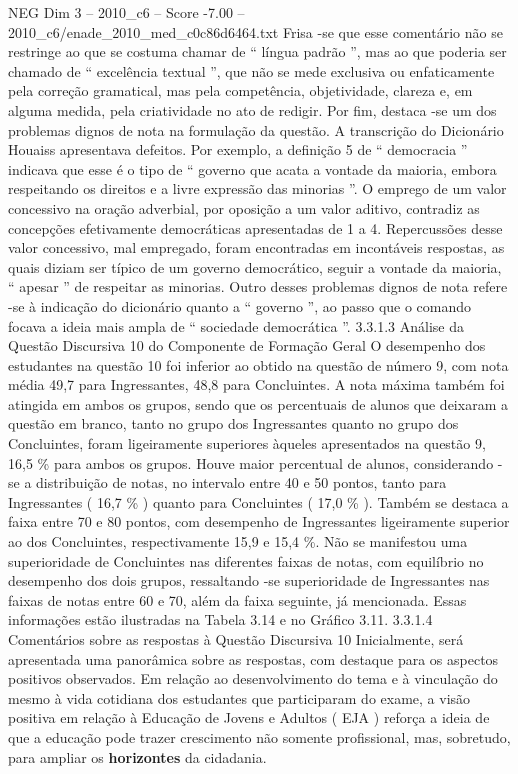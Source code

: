 \begin{textsample}{NEG Dim 3 – 2010\_c6 – Score -7.00 – 2010\_c6/enade\_2010\_med\_c0c86d6464.txt}
Frisa -se que esse comentário não se restringe ao que se costuma chamar de “ língua padrão ”, mas ao que poderia ser chamado de “ excelência textual ”, que não se mede exclusiva ou enfaticamente pela correção gramatical, mas pela competência, objetividade, clareza e, em alguma medida, pela criatividade no ato de redigir.
Por fim, destaca -se um dos problemas dignos de nota na formulação da questão.
A transcrição do Dicionário Houaiss apresentava defeitos.
Por exemplo, a definição 5 de “ democracia ” indicava que esse é o tipo de “ governo que acata a vontade da maioria, embora respeitando os direitos e a livre expressão das minorias ”.
O emprego de um valor concessivo na oração adverbial, por oposição a um valor aditivo, contradiz as concepções efetivamente democráticas apresentadas de 1 a 4.
Repercussões desse valor concessivo, mal empregado, foram encontradas em incontáveis respostas, as quais diziam ser típico de um governo democrático, seguir a vontade da maioria, “ apesar ” de respeitar as minorias.
Outro desses problemas dignos de nota refere -se à indicação do dicionário quanto a “ governo ”, ao passo que o comando focava a ideia mais ampla de “ sociedade democrática ”. 3.3.1.3 Análise da Questão Discursiva 10 do Componente de Formação Geral O desempenho dos estudantes na questão 10 foi inferior ao obtido na questão de número 9, com nota média 49,7 para Ingressantes, 48,8 para Concluintes.
A nota máxima também foi atingida em ambos os grupos, sendo que os percentuais de alunos que deixaram a questão em branco, tanto no grupo dos Ingressantes quanto no grupo dos Concluintes, foram ligeiramente superiores àqueles apresentados na questão 9, 16,5 \% para ambos os grupos.
Houve maior percentual de alunos, considerando -se a distribuição de notas, no intervalo entre 40 e 50 pontos, tanto para Ingressantes ( 16,7 \% ) quanto para Concluintes ( 17,0 \% ).
Também se destaca a faixa entre 70 e 80 pontos, com desempenho de Ingressantes ligeiramente superior ao dos Concluintes, respectivamente 15,9 e 15,4 \%.
Não se manifestou uma superioridade de Concluintes nas diferentes faixas de notas, com equilíbrio no desempenho dos dois grupos, ressaltando -se superioridade de Ingressantes nas faixas de notas entre 60 e 70, além da faixa seguinte, já mencionada.
Essas informações estão ilustradas na Tabela 3.14 e no Gráfico 3.11. 3.3.1.4 Comentários sobre as respostas à Questão Discursiva 10 Inicialmente, será apresentada uma panorâmica sobre as respostas, com destaque para os aspectos positivos observados.
Em relação ao desenvolvimento do tema e à vinculação do mesmo à vida cotidiana dos estudantes que participaram do exame, a visão positiva em relação à Educação de Jovens e Adultos ( EJA ) reforça a ideia de que a educação pode trazer crescimento não somente profissional, mas, sobretudo, para ampliar os \textbf{horizontes} da cidadania.

\end{textsample}
